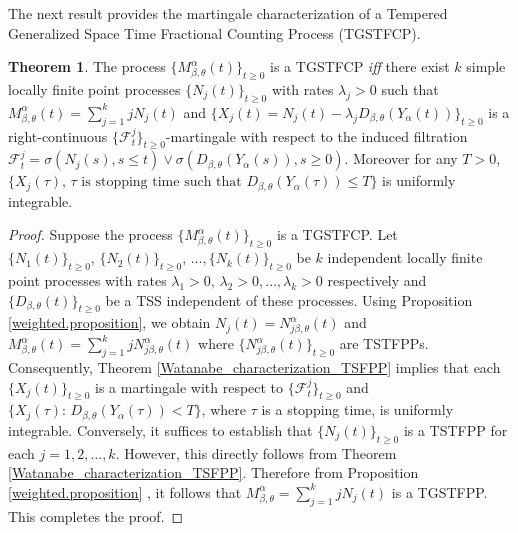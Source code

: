 \documentclass[11pt,oneside,reqno]{amsart}
\theoremstyle{definition}
\newtheorem{theorem}{\bf Theorem}[section]
\theoremstyle{remarkstyle}
\begin{document}
The next result provides the martingale characterization of a Tempered Generalized Space Time Fractional Counting Process (TGSTFCP).
\begin{theorem}\label{martingale characterization_TGSTFCP}
The process $\{M^{\alpha}_{\beta,\theta}(t)\}_{t\ge 0}$ is a TGSTFCP {\it iff} there exist $k$ simple locally finite point processes $\{N_{j}(t)\}_{t\ge 0}$ with rates $\lambda_j>0$ such that $M^{\alpha}_{\beta,\theta}(t)=\sum_{j=1}^k jN_{j}(t)$ and $\{X_j(t)=N_{j}(t)-\lambda_jD_{\beta,\theta}(Y_{\alpha}(t))\}_{t\ge 0}$ is a right-continuous $\{\mathcal{F}^j_t\}_{t\ge 0}$-martingale with respect to the induced filtration $\mathcal{F}^j_t=\sigma(N_{j}(s),s\le t)\vee\sigma (D_{\beta,\theta}(Y_{\alpha}(s)), s\ge 0)$. Moreover for any $T>0$, $\{X_j(\tau),\,\tau\,\, \text{is stopping time such that}\,\,D_{\beta,\theta}(Y_{\alpha}(\tau))\le T\}$ is uniformly integrable. 
\end{theorem}

\begin{proof}
Suppose the process $\{M^{\alpha}_{\beta,\theta}(t)\}_{t\ge 0}$ is a TGSTFCP. Let $\{N_1(t)\}_{t\ge 0},\,\{N_2(t)\}_{t\ge 0},\,\ldots,\{N_k(t)\}_{t\ge 0}$ be $k$ independent locally finite point processes with rates $\lambda_1>0,\,\lambda_2>0,\ldots,\lambda_k>0$ respectively and $\{D_{\beta,\theta}(t)\}_{t\ge 0}$ be a TSS independent of these processes. Using Proposition \ref{weighted.proposition}, we obtain $N_j(t)=N^{\alpha}_{j\beta,\theta}(t)$ and $M^{\alpha}_{\beta,\theta}(t)=\sum_{j=1}^{k}jN^{\alpha}_{j\beta,\theta}(t)$ where $\{N^{\alpha}_{j\beta,\theta}(t)\}_{t\ge 0}$ are TSTFPPs. Consequently, Theorem \ref{Watanabe_characterization_TSFPP} implies that each $\{X_j(t)\}_{t\ge 0}$ is a martingale with respect to $\{\mathcal{F}^j_t\}_{t\ge 0}$ and $\{X_j(\tau):\,D_{\beta,\theta}(Y_{\alpha}(\tau))<T\}$, where $\tau$ is a stopping time, is uniformly integrable. Conversely, it suffices to establish that  $\{N_{j}(t)\}_{t\ge 0}$ is a TSTFPP for each $j=1,2,\dots,k$. However, this directly follows from Theorem \ref{Watanabe_characterization_TSFPP}. Therefore from Proposition \ref{weighted.proposition} , it follows that $M^{\alpha}_{\beta,\theta}=\sum_{j=1}^k jN_{j}(t)$ is a TGSTFPP. This completes the proof.    
\end{proof}
\end{document}
